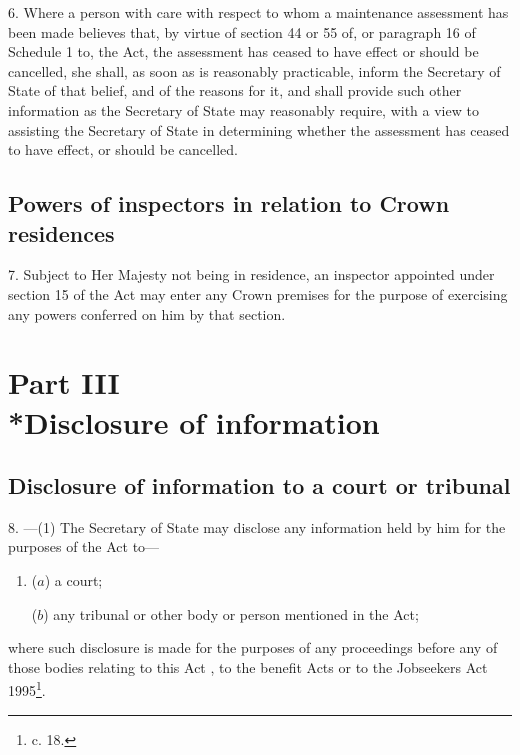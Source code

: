 \documentclass[a4paper,12pt]{article}
\begin{document}
6.  Where a person with care with respect to whom a maintenance assessment has been made believes that, by virtue of section 44 or 55 of, or paragraph 16 of Schedule 1 to, the Act, the assessment has ceased to have effect or should be cancelled, she shall, as soon as is reasonably practicable, inform the Secretary of State of that belief, and of the reasons for it, and shall provide such other information as the Secretary of State may reasonably require, with a view to assisting the Secretary of State 
in determining whether the assessment has ceased to have effect, or should be cancelled.


\subsection[7. Powers of inspectors in relation to Crown residences]{Powers of inspectors in relation to Crown residences}

7.  Subject to Her Majesty not being in residence, an inspector appointed under section 15 of the Act may enter any Crown premises for the purpose of exercising any powers conferred on him by that section.

\section[Part III --- Disclosure of information]{Part III\\*Disclosure of information}

\renewcommand\parthead{--- Part III}

\subsection[8. Disclosure of information to a court or tribunal]{Disclosure of information to a court or tribunal}

8.%
---(1)  %
  The Secretary of State 
may disclose any information held by 
him  %
for the purposes of the Act to—
\begin{enumerate}\item[]
($a$) a court;

($b$) any tribunal or other body or person mentioned in the Act;
\end{enumerate}
where such disclosure is made for the purposes of any proceedings before any of those bodies relating to this Act%
, to the benefit Acts or to the Jobseekers Act 1995\footnote{ c. 18.}.  %
\end{document}
